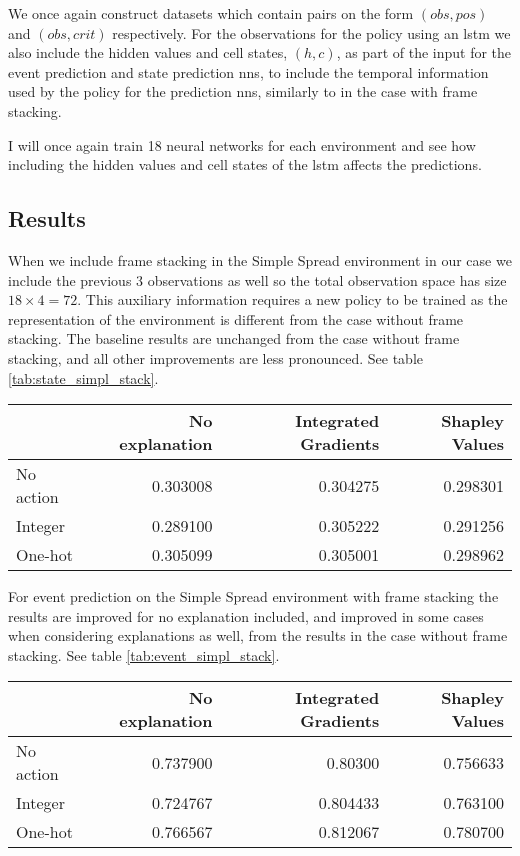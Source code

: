 \documentclass[UKenglish]{uiomasterthesis}
\begin{document}
We once again construct datasets which contain pairs on the form $(obs, pos)$ and $(obs, crit)$ respectively. For the observations for the policy using an \ac{lstm} we also include the hidden values and cell states, $(h,c)$, as part of the input for the event prediction and state prediction \acp{nn}, to include the temporal information used by the policy for the prediction \acp{nn}, similarly to in the case with frame stacking.

I will once again train 18 neural networks for each environment and see how including the hidden values and cell states of the \ac{lstm} affects the predictions.

\subsection{Results}
When we include frame stacking in the Simple Spread environment in our case we include the previous 3 observations as well so the total observation space has size $18\times 4 = 72$. This auxiliary information requires a new policy to be trained as the representation of the environment is different from the case without frame stacking. The baseline results are unchanged from the case without frame stacking, and all other improvements are less pronounced. See table \ref{tab:state_simpl_stack}.

\begin{center}
\label{tab:state_simpl_stack}
\begin{tabular}{lrrr}
\toprule
 & No explanation & Integrated Gradients & Shapley Values \\
\midrule
No action & 0.303008 & 0.304275 & 0.298301 \\
Integer & 0.289100 & 0.305222 & 0.291256 \\
One-hot & 0.305099 & 0.305001 & 0.298962 \\
\bottomrule
\end{tabular}
\end{center}

For event prediction on the Simple Spread environment with frame stacking the results are improved for no explanation included, and improved in some cases when considering explanations as well, from the results in the case without frame stacking. See table \ref{tab:event_simpl_stack}.


\begin{center}
\label{tab:event_simpl_stack}
\begin{tabular}{lrrr}
\toprule
 & No explanation & Integrated Gradients & Shapley Values \\
\midrule
No action & 0.737900 & 0.80300 & 0.756633 \\
Integer & 0.724767 & 0.804433 & 0.763100 \\
One-hot & 0.766567 & 0.812067 & 0.780700 \\
\bottomrule
\end{tabular}
\end{center}
\end{document}
